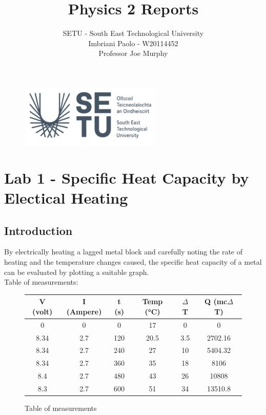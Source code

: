 \documentclass[a4paper]{article}
\title{Physics 2 Reports}
\author{SETU - South East Technological University\\Imbriani Paolo - W20114452\\Professor Joe Murphy}
\begin{document}
\begin{figure}
    \centering
    \includegraphics[width=0.6\textwidth]{SETU.png}
    \label{fig:centered-image}
\end{figure}

\maketitle 

\pagebreak

\tableofcontents

\pagebreak

\section{Lab 1 -  Specific Heat Capacity by Electical Heating}

\subsection{Introduction}

By electrically heating a lagged metal block and carefully noting the rate of heating 
and the temperature changes caused, the specific heat capacity of a metal can be evaluated
by plotting a suitable graph.
\\
Table of measurements:


\begin{figure}[H]
\centering
\begin{tabular}{c|c|c|c|c|c}
    \textbf{V (volt)} & \textbf{I (Ampere)} & \textbf{t (s)} & \textbf{Temp (°C)} & \textbf{$\Delta$ T} & \textbf{Q (mc$\Delta$ T)} \\
    \hline
    0 & 0 & 0 & 17 & 0 & 0\\
    8.34 & 2.7 & 120 & 20.5 & 3.5 & 2702.16\\
    8.34 & 2.7 & 240 & 27 & 10 & 5404.32\\
    8.34 & 2.7 & 360 & 35 & 18 & 8106 \\
    8.4 & 2.7 & 480 & 43 & 26 &  10808\\
    8.3 & 2.7 & 600 & 51 & 34 & 13510.8\\
\end{tabular}
\caption{Table of measurements}
\end{figure}
\end{document}

